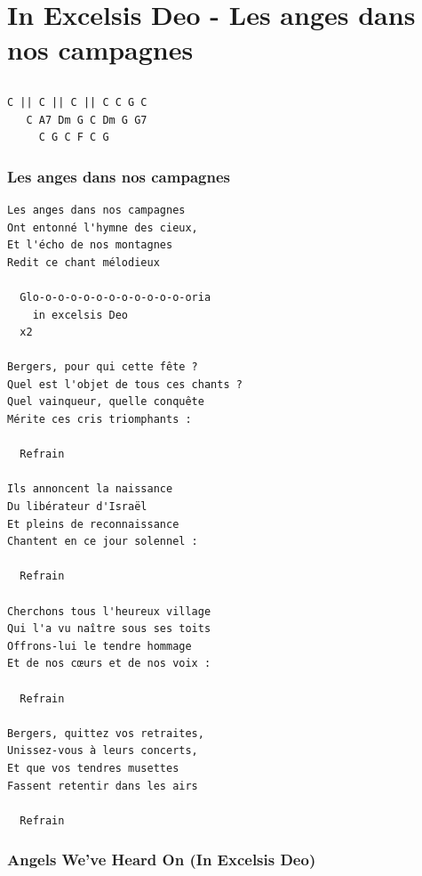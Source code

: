 \documentclass[
]{article}
\begin{document}
\hypertarget{in-excelsis-deo---les-anges-dans-nos-campagnes}{%
\section{In Excelsis Deo - Les anges dans nos
campagnes}\label{in-excelsis-deo---les-anges-dans-nos-campagnes}}

\hypertarget{section-6}{%
\subsection*{}\label{section-6}}

\begin{verbatim}
C || C || C || C C G C 
   C A7 Dm G C Dm G G7
     C G C F C G 
\end{verbatim}

\hypertarget{les-anges-dans-nos-campagnes}{%
\subsubsection*{Les anges dans nos
campagnes}\label{les-anges-dans-nos-campagnes}}

\begin{verbatim}
Les anges dans nos campagnes 
Ont entonné l'hymne des cieux, 
Et l'écho de nos montagnes 
Redit ce chant mélodieux 

  Glo-o-o-o-o-o-o-o-o-o-o-o-oria 
    in excelsis Deo 
  x2

Bergers, pour qui cette fête ? 
Quel est l'objet de tous ces chants ? 
Quel vainqueur, quelle conquête 
Mérite ces cris triomphants : 

  Refrain

Ils annoncent la naissance 
Du libérateur d'Israël 
Et pleins de reconnaissance 
Chantent en ce jour solennel : 

  Refrain
  
Cherchons tous l'heureux village 
Qui l'a vu naître sous ses toits 
Offrons-lui le tendre hommage 
Et de nos cœurs et de nos voix : 

  Refrain

Bergers, quittez vos retraites, 
Unissez-vous à leurs concerts, 
Et que vos tendres musettes 
Fassent retentir dans les airs 

  Refrain
\end{verbatim}

\hypertarget{angels-weve-heard-on-in-excelsis-deo}{%
\subsubsection*{Angels We've Heard On (In Excelsis
Deo)}\label{angels-weve-heard-on-in-excelsis-deo}}
\end{document}
